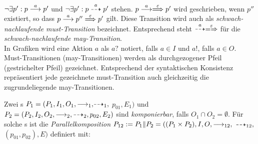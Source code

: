 $\neg\exists p': p\must[a]p'$ und $\neg\exists p': p\may[a]p'$ stehen.
$p\must[a]\weakmust[\varepsilon]p'$ wird geschrieben, wenn $p''$ existiert, so
dass $p\must[a]p''\weakmust[\varepsilon]p'$ gilt. Diese Transition wird auch
als \emph{schwach-nachlaufende must-Transition} bezeichnet. Entsprechend steht
$\may[a]\weakmay[\varepsilon]$ für die \emph{schwach-nachlaufende
may-Transition}.\\
In Grafiken wird eine Aktion $a$ als $a?$ notiert, falls $a\in I$ und $a!$,
falls $a\in O$. Must-Transitionen (may-Transitionen) werden als durchgezogener
Pfeil (gestrichelter Pfeil) gezeichnet. Entsprechend der syntaktischen
Konsistenz repräsentiert jede gezeichnete must-Transition auch gleichzeitig die
zugrundeliegende may-Transitionen.

\begin{Def}[Parallelkomposition]
  \label{ParallelDef}
  Zwei \MEIO{}s $P_1 = (P_1,I_1,O_1,{\must_1,}{\may_1,}$ $p_{01},E_1)$ und $P_2 =
  (P_2,I_2,O_2,\must_2,\may_2,p_{02},E_2)$ sind \emph{komponierbar}, falls
  $O_1\cap O_2=\emptyset$. Für solche \MEIO{}s ist die
  \emph{Parallelkomposition} $P_{12} := P_1\|P_2=((P_1\times P_2), I, O,
  {\must_{12},}$ ${\may_{12},}$ $(p_{01}, p_{02}), E)$ definiert mit:
\end{Def}
